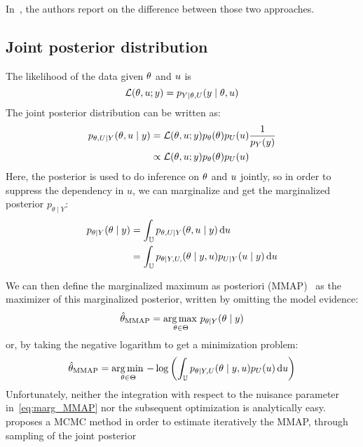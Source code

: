 \documentclass[../../Main_ManuscritThese.tex]{subfiles}
\begin{document}
In~\cite{berger_integrated_1999}, the authors report on the difference between those two approaches.
\cite{cheng_general_2008}

\subsection{Joint posterior distribution}
The likelihood of the data given $\theta$ and $u$ is
\begin{equation}
  \mathcal{L}(\theta,u;y) = p_{Y \mid \theta, U}(y\mid \theta,u)
\end{equation}
The joint posterior distribution can be written as:
\begin{align}
  p_{\theta,U \mid Y}(\theta,u \mid y) &= \mathcal{L}(\theta,u;y)p_{\theta}(\theta)p_{U}(u) \frac{1}{p_Y(y)} \\
  &\propto \mathcal{L}(\theta,u;y)p_{\theta}(\theta)p_{U}(u)
\end{align}
Here, the posterior is used to do inference on $\theta$ and $u$ jointly, so in order to suppress the dependency in $u$, we can marginalize and get the marginalized posterior $p_{\theta \mid Y}$:
\begin{align}
  p_{\theta \mid Y}(\theta \mid y) &= \int_{\mathbb{U}} p_{\theta,U\mid Y}(\theta,u\mid y)\,\mathrm{d}u \label{eq:marg_MMAP}\\
                             &= \int_{\mathbb{U}}p_{\theta \mid Y, U,}(\theta \mid y, u) p_{U\mid Y}(u \mid y)\,\mathrm{d}u
\end{align}

We can then define the marginalized maximum as posteriori (MMAP)~\cite{doucet_marginal_2002} as the  maximizer of this marginalized posterior, written by omitting the model evidence:
\begin{equation}
  \label{eq:def_MMAP}
  \hat{\theta}_{\mathrm{MMAP}} = \operatorname*{arg\,max \,}_{\theta\in\Theta} p_{\theta \mid Y}(\theta\mid y)
\end{equation}
or, by taking the negative logarithm to get a minimization problem:
\begin{equation}
\hat{\theta}_{\mathrm{MMAP}}    = \operatorname*{arg\,min \,}_{\theta\in\Theta} -\log \left(\int_{\mathbb{U}} p_{\theta\mid Y,U}(\theta\mid y, u) p_{U}(u)\,\mathrm{d}u \right)
\end{equation}
Unfortunately, neither the integration with respect to the nuisance parameter in~\eqref{eq:marg_MMAP} nor the subsequent optimization is analytically easy. \cite{doucet_marginal_2002} proposes a MCMC method in order to estimate iteratively the MMAP, through sampling of the joint posterior
\end{document}
